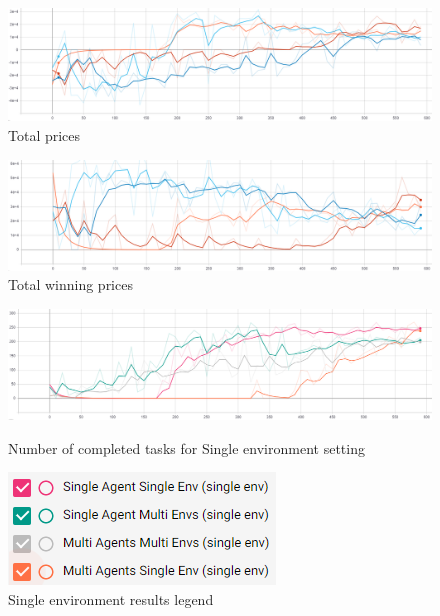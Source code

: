 \begin{figure}[H]
    \centering
    \includegraphics[width=\linewidth]{figures/5_evaluation_figs/env_training_fig/total_prices.png}
    \caption{Total prices}
    \label{fig:env_total_prices}
\end{figure}

\begin{figure}[H]
    \centering
    \includegraphics[width=\linewidth]{figures/5_evaluation_figs/env_training_fig/total_winning_prices.PNG}
    \caption{Total winning prices}
    \label{fig:env_winning_prices}
\end{figure}

\begin{figure}[H]
    \centering
    \begin{minipage}{0.75\linewidth}
        \centering
        \includegraphics[width=\linewidth]{figures/5_evaluation_figs/env_training_fig/single_env_num_completed_tasks.png}
        \caption{Number of completed tasks for Single environment setting}
        \label{fig:single_env_num_completed_tasks}
    \end{minipage}\hfill
    \begin{minipage}{0.25\linewidth}
        \centering
        \includegraphics[width=\linewidth]{figures/5_evaluation_figs/env_training_fig/single_env_legend.png}
        \caption{Single environment results legend}
        \label{fig:single_env_legend}
    \end{minipage}
\end{figure}

